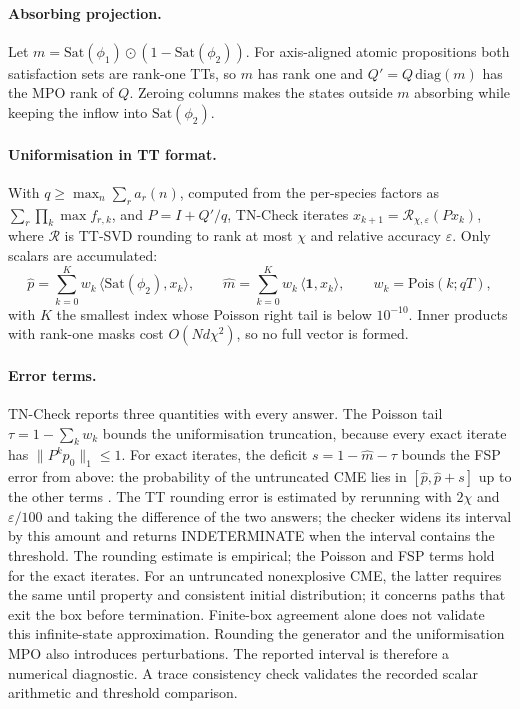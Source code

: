 \documentclass[11pt]{article}
\begin{document}
\paragraph{Absorbing projection.} Let $m=\mathrm{Sat}(\phi_1)\odot(1-\mathrm{Sat}(\phi_2))$.
For axis-aligned atomic propositions both satisfaction sets are rank-one TTs, so
$m$ has rank one and $Q'=Q\,\mathrm{diag}(m)$ has the MPO rank of $Q$. Zeroing columns
makes the states outside $m$ absorbing while keeping the inflow into
$\mathrm{Sat}(\phi_2)$.

\paragraph{Uniformisation in TT format.} With
$q\ge\max_n\sum_r a_r(n)$, computed from the per-species factors as
$\sum_r\prod_k\max f_{r,k}$, and $P=I+Q'/q$, TN-Check iterates
$x_{k+1}=\mathcal{R}_{\chi,\varepsilon}(Px_k)$, where $\mathcal{R}$ is TT-SVD rounding
\cite{oseledets2011tt} to rank at most $\chi$ and relative accuracy $\varepsilon$. Only
scalars are accumulated:
\[
\hat p=\sum_{k=0}^{K} w_k\,\langle \mathrm{Sat}(\phi_2),x_k\rangle,\qquad
\hat m=\sum_{k=0}^{K} w_k\,\langle \mathbf 1,x_k\rangle,\qquad
w_k=\mathrm{Pois}(k;qT),
\]
with $K$ the smallest index whose Poisson right tail is below $10^{-10}$. Inner
products with rank-one masks cost $O(Nd\chi^2)$, so no full vector is formed.

\paragraph{Error terms.} TN-Check reports three quantities with every answer. The
Poisson tail $\tau=1-\sum_k w_k$ bounds the uniformisation truncation, because every
exact iterate has $\|P^kp_0\|_1\le1$. For exact iterates, the deficit $s=1-\hat m-\tau$ bounds the FSP
error from above: the probability of the untruncated CME lies in
$[\hat p,\hat p+s]$ up to the other terms \cite{munsky2006fsp}. The TT rounding error is
estimated by rerunning with $2\chi$ and $\varepsilon/100$ and taking the difference of
the two answers; the checker widens its interval by this amount and returns
INDETERMINATE when the interval contains the threshold. The rounding estimate is
empirical; the Poisson and FSP terms hold for the exact iterates. For an
untruncated nonexplosive CME, the latter requires the same until property
and consistent initial distribution; it concerns paths that exit the box
before termination. Finite-box agreement alone does not validate this
infinite-state approximation. Rounding the
generator and the uniformisation MPO also introduces perturbations. The
reported interval is therefore a numerical diagnostic. A trace consistency
check validates the recorded scalar arithmetic and threshold comparison.
\end{document}
